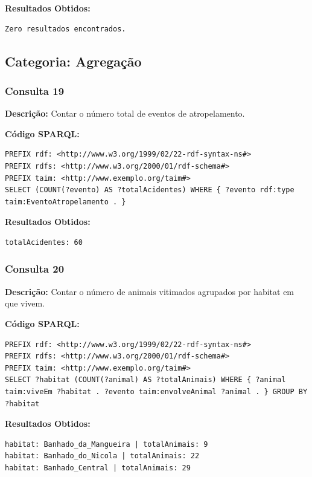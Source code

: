 \documentclass[12pt,a4paper]{article}
\begin{document}
\textbf{Resultados Obtidos:}
\begin{lstlisting}
Zero resultados encontrados.
\end{lstlisting}

\vspace{1cm}
\subsection*{Categoria: Agregação}

\subsubsection*{Consulta 19}

\textbf{Descrição:} Contar o número total de eventos de atropelamento.

\textbf{Código SPARQL:}
\begin{lstlisting}
PREFIX rdf: <http://www.w3.org/1999/02/22-rdf-syntax-ns#>
PREFIX rdfs: <http://www.w3.org/2000/01/rdf-schema#>
PREFIX taim: <http://www.exemplo.org/taim#>
SELECT (COUNT(?evento) AS ?totalAcidentes) WHERE { ?evento rdf:type taim:EventoAtropelamento . }
\end{lstlisting}

\textbf{Resultados Obtidos:}
\begin{lstlisting}
totalAcidentes: 60
\end{lstlisting}

\vspace{1cm}
\subsubsection*{Consulta 20}

\textbf{Descrição:} Contar o número de animais vitimados agrupados por habitat em que vivem.

\textbf{Código SPARQL:}
\begin{lstlisting}
PREFIX rdf: <http://www.w3.org/1999/02/22-rdf-syntax-ns#>
PREFIX rdfs: <http://www.w3.org/2000/01/rdf-schema#>
PREFIX taim: <http://www.exemplo.org/taim#>
SELECT ?habitat (COUNT(?animal) AS ?totalAnimais) WHERE { ?animal taim:viveEm ?habitat . ?evento taim:envolveAnimal ?animal . } GROUP BY ?habitat
\end{lstlisting}

\textbf{Resultados Obtidos:}
\begin{lstlisting}
habitat: Banhado_da_Mangueira | totalAnimais: 9
habitat: Banhado_do_Nicola | totalAnimais: 22
habitat: Banhado_Central | totalAnimais: 29
\end{lstlisting}
\end{document}
